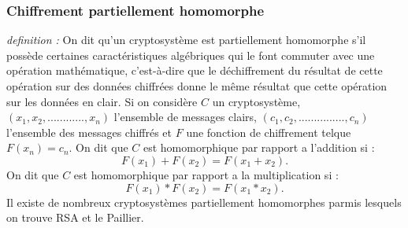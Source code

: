 \documentclass[a4paper,12pt]{article}
\begin{document}
\subsubsection{Chiffrement partiellement homomorphe}
\textit{definition : } On dit qu'un cryptosystème est partiellement homomorphe  s'il possède certaines caractéristiques algébriques qui le font commuter avec une opération mathématique, c'est-à-dire que le déchiffrement du résultat de cette opération sur des données chiffrées donne le même résultat que cette opération sur les données en clair. \newline
Si on considère $C$ un cryptosystème, $(x_1, x_2, ............, x_n)$ l'ensemble de messages clairs, $(c_1, c_2, ..............., c_n)$ l'ensemble des messages chiffrés et $ F$ une fonction de chiffrement telque $F(x_n) = c_n$. \newline
On dit que $C$ est homomorphique par rapport a l'addition si : \newline
 $$F(x_1) + F(x_2) = F(x_1 + x_2).$$
 On dit que $C$ est homomorphique par rapport a la multiplication si : \newline
 $$F(x_1) * F(x_2) = F(x_1 * x_2).$$
Il existe de nombreux cryptosystèmes partiellement homomorphes parmis lesquels on trouve RSA et le Paillier.%
\end{document}
